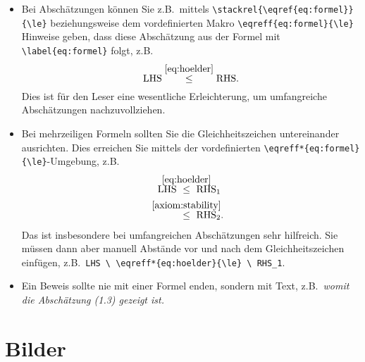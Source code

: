 \begin{itemize}
  Das macht die Aussagen referenzierbar und Sie können mittels \verb$\eqref$ auf die Annahme referenzieren,
  z.B. \emph{Aus der Stabilität \eqref{axiom:stability} folgt ...}.

  \item Bei Abschätzungen können Sie z.B.\ mittels \verb$\stackrel{\eqref{eq:formel}}{\le}$ beziehungsweise dem vordefinierten Makro \verb$\eqreff{eq:formel}{\le}$ Hinweise geben, dass diese Abschätzung aus der Formel mit \verb$\label{eq:formel}$ folgt, z.B.
        \begin{equation*}
          \textup{LHS} \eqreff{eq:hoelder}{\le} \textup{RHS}.
        \end{equation*}
        Dies ist für den Leser eine wesentliche Erleichterung, um umfangreiche Abschätzungen nachzuvollziehen.

  \item Bei mehrzeiligen Formeln sollten Sie die Gleichheitszeichen untereinander ausrichten. Dies erreichen Sie mittels der vordefinierten \verb$\eqreff*{eq:formel}{\le}$-Umgebung, z.B.
        \begin{align*}
          \textup{LHS} \  & \eqreff*{eq:hoelder}{\le} \ \textup{RHS}_1  \\
                          & \eqreff*{axiom:stability}{\le} \ \textup{RHS}_2.
        \end{align*}
        Das ist insbesondere bei umfangreichen Abschätzungen sehr hilfreich. Sie müssen dann aber
        manuell Abstände vor und nach dem Gleichheitszeichen einfügen, z.B.\ \verb$LHS \ \eqreff*{eq:hoelder}{\le} \ RHS_1$.

  \item Ein Beweis sollte nie mit einer Formel enden, sondern mit Text, z.B.\ \emph{womit die Abschätzung {\normalfont(1.3)} gezeigt ist.}
\end{itemize}

\section{Bilder}

